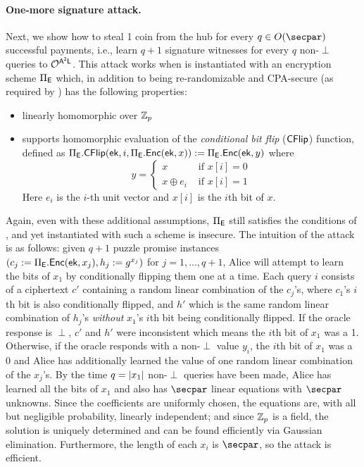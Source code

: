 \paragraph{One-more signature attack.} Next, we show how to steal 1 coin from the hub for every $q \in O(\secpar)$ successful payments, i.e., learn $q+1$ signature witnesses for every $q$ non-$\perp$ queries to $\mathcal{O}^{\sf A^2L}$. This attack works when \AAL is instantiated with an encryption scheme $\Pi_{\mathsf{E}}$ which, in addition to being re-randomizable and CPA-secure (as required by ) has the following properties:
\begin{itemize}
    \item linearly homomorphic over $\mathbb{Z}_p$
    \item supports homomorphic evaluation of the \emph{conditional bit flip} ($\sf CFlip$) function, defined as $\Pi_{\mathsf{E}}.\mathsf{CFlip}(\mathsf{ek}, i, \Pi_{\mathsf{E}}.\mathsf{Enc}(\mathsf{ek}, x)) := \Pi_{\mathsf{E}}.\mathsf{Enc}(\mathsf{ek}, y)$ where
    \[
        y = \begin{cases} 
            x &\text{ if } x[i] = 0\\ 
            x \oplus e_i &\text{ if } x[i] = 1
        \end{cases}
    \]
    Here $e_i$ is the $i$-th unit vector and $x[i]$ is the $i$th bit of $x$.
\end{itemize}
Again, even with these additional assumptions, $\Pi_{\mathsf{E}}$ still satisfies the conditions of , and yet \AAL instantiated with such a scheme is insecure. The intuition of the attack is as follows: given $q+1$ puzzle promise instances $(c_j := \Pi_{\mathsf{E}}.\mathsf{Enc}(\mathsf{ek}, x_j), h_j := g^{x_j})$ for $j = 1, \dots, q+1$, Alice will attempt to learn the bits of $x_1$ by conditionally flipping them one at a time. Each query $i$ consists of a ciphertext $c'$ containing a random linear combination of the $c_j$'s, where $c_1$'s $i$th bit is also conditionally flipped, and $h'$ which is the same random linear combination of $h_j$'s \emph{without} $x_1$'s $i$th bit being conditionally flipped. If the oracle response is $\perp$, $c'$ and $h'$ were inconsistent which means the $i$th bit of $x_1$ was a 1. Otherwise, if the oracle responds with a non-$\perp$ value $y_i$, the $i$th bit of $x_1$ was a 0 and Alice has additionally learned the value of one random linear combination of the $x_j$'s. By the time $q = \lvert x_1 \rvert$ non-$\perp$ queries have been made, Alice has learned all the bits of $x_1$ and also has $\secpar$ linear equations with $\secpar$ unknowns. Since the coefficients are uniformly chosen, the equations are, with all but negligible probability, linearly independent; and since $\mathbb{Z}_p$ is a field, the solution is uniquely determined and can be found efficiently via Gaussian elimination. Furthermore, the length of each $x_i$ is $\secpar$, so the attack is efficient.


